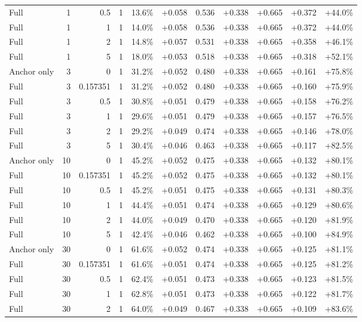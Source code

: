 \begin{table}[htbp]
\begin{tabular}{lrrrccccccc}
Full & 1 & 0.5 & 1 & 13.6\% & +0.058 & 0.536 & +0.338 & +0.665 & +0.372 & +44.0\% \\
Full & 1 & 1 & 1 & 14.0\% & +0.058 & 0.536 & +0.338 & +0.665 & +0.372 & +44.0\% \\
Full & 1 & 2 & 1 & 14.8\% & +0.057 & 0.531 & +0.338 & +0.665 & +0.358 & +46.1\% \\
Full & 1 & 5 & 1 & 18.0\% & +0.053 & 0.518 & +0.338 & +0.665 & +0.318 & +52.1\% \\
Anchor only & 3 & 0 & 1 & 31.2\% & +0.052 & 0.480 & +0.338 & +0.665 & +0.161 & +75.8\% \\
Full & 3 & 0.157351 & 1 & 31.2\% & +0.052 & 0.480 & +0.338 & +0.665 & +0.160 & +75.9\% \\
Full & 3 & 0.5 & 1 & 30.8\% & +0.051 & 0.479 & +0.338 & +0.665 & +0.158 & +76.2\% \\
Full & 3 & 1 & 1 & 29.6\% & +0.051 & 0.479 & +0.338 & +0.665 & +0.157 & +76.5\% \\
Full & 3 & 2 & 1 & 29.2\% & +0.049 & 0.474 & +0.338 & +0.665 & +0.146 & +78.0\% \\
Full & 3 & 5 & 1 & 30.4\% & +0.046 & 0.463 & +0.338 & +0.665 & +0.117 & +82.5\% \\
Anchor only & 10 & 0 & 1 & 45.2\% & +0.052 & 0.475 & +0.338 & +0.665 & +0.132 & +80.1\% \\
Full & 10 & 0.157351 & 1 & 45.2\% & +0.052 & 0.475 & +0.338 & +0.665 & +0.132 & +80.1\% \\
Full & 10 & 0.5 & 1 & 45.2\% & +0.051 & 0.475 & +0.338 & +0.665 & +0.131 & +80.3\% \\
Full & 10 & 1 & 1 & 44.4\% & +0.051 & 0.474 & +0.338 & +0.665 & +0.129 & +80.6\% \\
Full & 10 & 2 & 1 & 44.0\% & +0.049 & 0.470 & +0.338 & +0.665 & +0.120 & +81.9\% \\
Full & 10 & 5 & 1 & 42.4\% & +0.046 & 0.462 & +0.338 & +0.665 & +0.100 & +84.9\% \\
Anchor only & 30 & 0 & 1 & 61.6\% & +0.052 & 0.474 & +0.338 & +0.665 & +0.125 & +81.1\% \\
Full & 30 & 0.157351 & 1 & 61.6\% & +0.051 & 0.474 & +0.338 & +0.665 & +0.125 & +81.2\% \\
Full & 30 & 0.5 & 1 & 62.4\% & +0.051 & 0.473 & +0.338 & +0.665 & +0.123 & +81.5\% \\
Full & 30 & 1 & 1 & 62.8\% & +0.051 & 0.473 & +0.338 & +0.665 & +0.122 & +81.7\% \\
Full & 30 & 2 & 1 & 64.0\% & +0.049 & 0.467 & +0.338 & +0.665 & +0.109 & +83.6\% \\

\end{tabular}
\end{table}
